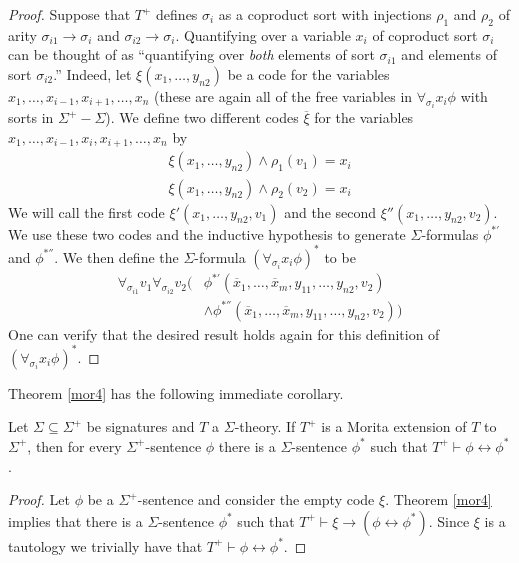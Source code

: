 \begin{proof}
Suppose that $T^+$ defines $\sigma_i$ as a coproduct sort with
injections $\rho_1$ and $\rho_2$ of arity
$\sigma_{i1}\rightarrow\sigma_{i}$ and
$\sigma_{i2}\rightarrow\sigma_i$.  Quantifying over a variable $x_i$
of coproduct sort $\sigma_i$ can be thought of as ``quantifying over
\textit{both} elements of sort $\sigma_{i1}$ and elements of sort
$\sigma_{i2}$.''  Indeed, let $\xi(x_1,\ldots, y_{n2})$ be a code for
the variables $x_1,\ldots, x_{i-1}, x_{i+1}, \ldots, x_n$ (these are
again all of the free variables in $\forall_{\sigma_i}x_i\phi$ with
sorts in $\Sigma^+-\Sigma$). We define two different codes
$\overline{\xi}$ for the variables
$x_1,\ldots, x_{i-1}, x_i, x_{i+1}, \ldots, x_n$ by
\begin{gather*}
\xi(x_1,\ldots, y_{n2})\land\rho_1(v_1)=x_i\\
\xi(x_1,\ldots, y_{n2})\land\rho_2(v_2)=x_i
\end{gather*}
We will call the first code $\xi'(x_1,\ldots, y_{n2}, v_1)$ and the
second $\xi''(x_1,\ldots, y_{n2}, v_2)$. We use these two codes and
the inductive hypothesis to generate $\Sigma$-formulas $\phi^{*'}$ and
$\phi^{*''}$. We then define the $\Sigma$-formula
$(\forall_{\sigma_i}x_i\phi)^*$ to be
\begin{align*}
  \forall_{\sigma_{i1}}v_1\forall_{\sigma_{i2}}v_2\big(&\phi^{*'}(\overline{x}_1,\ldots,\overline{x}_m,y_{11}, \ldots, y_{n2}, v_2)\\
                                                       &\land\phi^{*''}(\overline{x}_1,\ldots, \overline{x}_m,y_{11},\ldots, y_{n2}, v_2)\big)
\end{align*}
One can verify that the desired result holds again for this definition
of $(\forall_{\sigma_i}x_i\phi)^*$.
\end{proof}

Theorem \ref{mor4} has the following immediate corollary.

\begin{cor} Let $\Sigma\subseteq\Sigma^+$ be signatures and $T$ a
  $\Sigma$-theory. If $T^+$ is a Morita extension of $T$ to
  $\Sigma^+$, then for every $\Sigma^+$-sentence $\phi$ there is a
  $\Sigma$-sentence $\phi^*$ such that
  $T^+\vdash\phi\leftrightarrow\phi^*$. \label{morph}
\end{cor}

\begin{proof} Let $\phi$ be a $\Sigma^+$-sentence and consider the
  empty code $\xi$.  Theorem \ref{mor4} implies that there is a
  $\Sigma$-sentence $\phi^*$ such that
  $T^+\vdash \xi\rightarrow (\phi\leftrightarrow\phi^*)$. Since $\xi$
  is a tautology we trivially have that
  $T^+\vdash\phi\leftrightarrow\phi^*$.
\end{proof}


